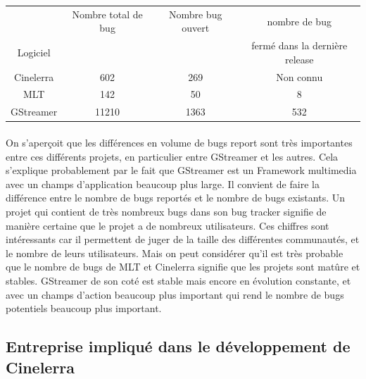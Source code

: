 \begin{center}

  \begin{tabular}{ | c | c | c | c|}

    \hline

         & Nombre total de bug & Nombre bug ouvert & nombre de bug \\

Logiciel &        & & fermé dans la dernière release \\

\hline \hline

Cinelerra & 602 & 269 & Non connu \\

\hline

MLT\index{MLT} & 142 & 50 & 8 \\

\hline

GStreamer & 11210 & 1363 &  532\\

\hline

  \end{tabular}

\end{center}

\paragraph{}

On s'aperçoit que les différences en volume de bugs report sont très
importantes entre ces différents projets, en particulier entre GStreamer
et les autres. Cela s'explique probablement par le fait que GStreamer
est un Framework multimedia avec un champs d'application beaucoup
plus large. Il convient de faire la différence entre le nombre de bugs
reportés et le nombre de bugs existants. Un projet qui contient de très
nombreux bugs dans son bug tracker signifie de manière certaine que le
projet a de nombreux utilisateurs. Ces chiffres sont intéressants car
il permettent de juger de la taille des différentes communautés, et le
nombre de leurs utilisateurs. Mais on peut considérer qu'il est très
probable que le nombre de bugs de MLT et Cinelerra signifie
que les projets sont matûre et stables. GStreamer de son coté est
stable mais encore en évolution constante, et avec un champs d'action
beaucoup plus important qui rend le nombre de bugs potentiels beaucoup
plus important.

\subsection {Entreprise impliqué dans le développement de Cinelerra}

